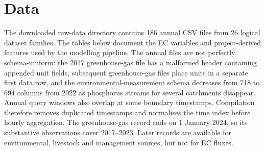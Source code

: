 
\chapter{Data}
\label{app:data-dictionary}

The downloaded raw-data directory contains 186 annual CSV files from 26 logical dataset families.
The tables below document the EC variables and project-derived features used by the modelling
pipeline. The annual files are not perfectly schema-uniform: the 2017 greenhouse-gas
file has a malformed header containing appended unit fields, subsequent greenhouse-gas files place
units in a separate first data row, and the environmental-measurement schema decreases from 718 to
694 columns from 2022 as phosphorus streams for several catchments disappear. Annual query windows
also overlap at some boundary timestamps. Compilation therefore removes duplicated timestamps and
normalises the time index before hourly aggregation. The greenhouse-gas record ends on 1 January
2024, so its substantive observations cover 2017--2023. Later records are available for environmental,
livestock and management sources, but not for EC fluxes.

